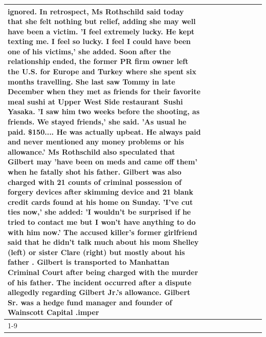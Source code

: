 \begin{table}[H]
\begin{tabular}{lllrlllll}
ignored. In retrospect, Ms Rothschild said today that she felt nothing but relief, adding she may well have been a victim. 'I feel extremely lucky. He kept texting me. I feel so lucky. I feel I could have been one of his victims,' she added. Soon after the relationship ended, the former PR firm owner left the U.S. for Europe and Turkey where she spent six months  travelling. She last saw Tommy in late December when they met as friends for their favorite meal sushi at Upper West Side restaurant Sushi Yasaka. 'I saw him two weeks before the shooting, as friends. We stayed friends,' she said. 'As usual he paid. \$150.... He was actually upbeat. He always paid and never mentioned any money problems or his allowance.' Ms Rothschild also speculated that Gilbert may 'have been on meds and came off them' when he fatally shot his father. Gilbert was also charged with 21 counts of criminal possession of forgery devices after skimming device and 21 blank credit cards found at his home on Sunday. 'I've cut ties now,' she added: 'I wouldn’t be surprised if he tried to contact me but I won’t have anything to do with him now.' The accused killer's former girlfriend said that he didn't talk much about his mom Shelley (left) or sister Clare (right) but mostly about his father . Gilbert is transported to Manhattan Criminal Court  after being charged with the murder of his father. The incident occurred after a dispute allegedly regarding Gilbert Jr.'s allowance. Gilbert Sr. was a hedge fund manager and founder of Wainscott Capital .imper \\
\cline{1-9}

\end{tabular}
\end{table}
